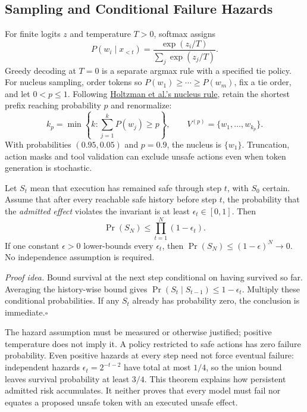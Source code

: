 \subsection{Sampling and Conditional Failure Hazards}

For finite logits $z$ and temperature $T>0$, softmax assigns
\begin{equation}
P(w_i\mid x_{<t})=\frac{\exp(z_i/T)}{\sum_j\exp(z_j/T)}.
\end{equation}
Greedy decoding at $T=0$ is a separate argmax rule with a specified tie policy. For nucleus sampling, order tokens so $P(w_1)\ge\cdots\ge P(w_m)$, fix a tie order, and let $0<p\le1$. Following \href{https://arxiv.org/abs/1904.09751}{Holtzman et al.'s nucleus rule}, retain the shortest prefix reaching probability $p$ and renormalize:
\begin{equation}
k_p=\min\left\{k:\sum_{j=1}^{k}P(w_j)\ge p\right\},\qquad
V^{(p)}=\{w_1,\ldots,w_{k_p}\}.
\end{equation}
With probabilities $(0.95,0.05)$ and $p=0.9$, the nucleus is $\{w_1\}$. Truncation, action masks and tool validation can exclude unsafe actions even when token generation is stochastic.

\begin{theorem}\label{thm:non-determinism}
Let $S_t$ mean that execution has remained safe through step $t$, with $S_0$ certain. Assume that after every reachable safe history before step $t$, the probability that the \emph{admitted effect} violates the invariant is at least $\epsilon_t\in[0,1]$. Then
\begin{equation}
\Pr(S_N)\le\prod_{t=1}^{N}(1-\epsilon_t).
\end{equation}
If one constant $\epsilon>0$ lower-bounds every $\epsilon_t$, then $\Pr(S_N)\le(1-\epsilon)^N\to0$. No independence assumption is required.
\end{theorem}
\noindent\textit{Proof idea.} Bound survival at the next step conditional on having survived so far. Averaging the history-wise bound gives $\Pr(S_t\mid S_{t-1})\le1-\epsilon_t$. Multiply these conditional probabilities. If any $S_t$ already has probability zero, the conclusion is immediate.\hfill$\square$

The hazard assumption must be measured or otherwise justified; positive temperature does not imply it. A policy restricted to safe actions has zero failure probability. Even positive hazards at every step need not force eventual failure: independent hazards $\epsilon_t=2^{-t-2}$ have total at most $1/4$, so the union bound leaves survival probability at least $3/4$. This theorem explains how persistent admitted risk accumulates. It neither proves that every model must fail nor equates a proposed unsafe token with an executed unsafe effect.


